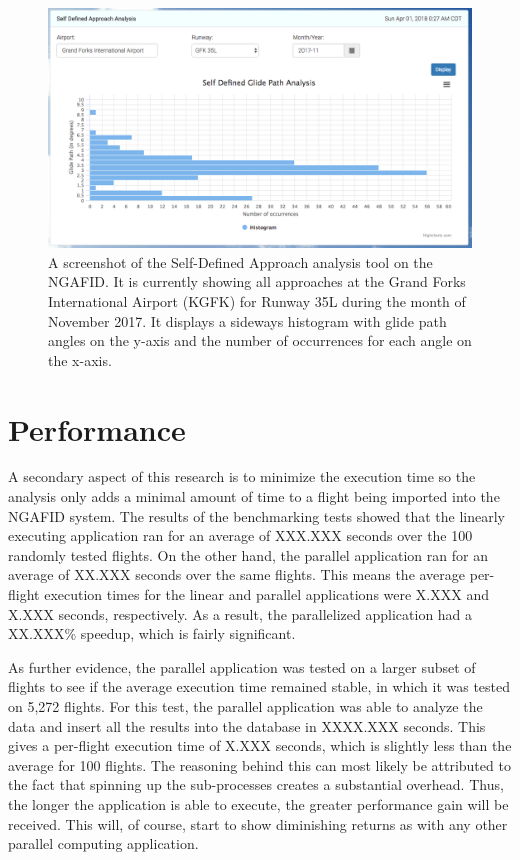     	\begin{figure}
    		\centering
            \includegraphics[width=\linewidth]{img/self_defined_screenshot}
            \caption{A screenshot of the Self-Defined Approach analysis tool on the NGAFID.  It is currently showing all approaches at the Grand Forks International Airport (KGFK) for Runway 35L during the month of November 2017.  It displays a sideways histogram with glide path angles on the y-axis and the number of occurrences for each angle on the x-axis.}
            \label{fig:self_defined_screenshot}
    	\end{figure}


\section{Performance}

	A secondary aspect of this research is to minimize the execution time so  the analysis only adds a minimal amount of time to a flight being imported into the NGAFID system.  The results of the benchmarking tests showed that the linearly executing application ran for an average of XXX.XXX seconds over the 100 randomly tested flights.  On the other hand, the parallel application ran for an average of XX.XXX seconds over the same flights.  This means the average per-flight execution times for the linear and parallel applications were X.XXX and X.XXX seconds, respectively.  As a result, the parallelized application had a XX.XXX\% speedup, which is fairly significant.  %
    
    As further evidence, the parallel application was tested on a larger subset of flights to see if the average execution time remained stable, in which it was tested on 5,272 flights.  For this test, the parallel application was able to analyze the data and insert all the results into the database in XXXX.XXX seconds.  This gives a per-flight execution time of X.XXX seconds, which is slightly less than the average for 100 flights.  The reasoning behind this can most likely be attributed to the fact that spinning up the sub-processes creates a substantial overhead.  Thus, the longer the application is able to execute, the greater performance gain will be received.  This will, of course, start to show diminishing returns as with any other parallel computing application.
    
